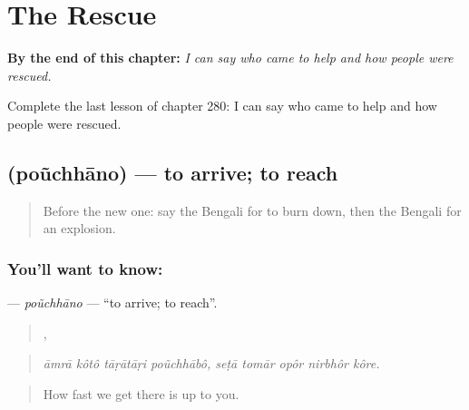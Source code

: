 
\chapter{The Rescue}
\label{ch:bn-the-rescue}

\begin{chapteropening}
\textbf{By the end of this chapter:} \emph{I can say who came to help and how people were rescued.}

Complete the last lesson of chapter 280: I can say who came to help and how people were rescued.
\end{chapteropening}

\section[\texorpdfstring{\bn{পৌঁছানো} (poũchhāno)}{পৌঁছানো (poũchhāno)}]{ (poũchhāno) — to arrive; to reach}

\label{lesson:BN-C280-pouchhano}



\begin{quote}
Before the new one: say the Bengali for to burn down, then the Bengali for an explosion.
\end{quote}

\subsection*{You'll want to know: }
\textbf{} — \emph{poũchhāno} — \textquotedblleft{}to arrive; to reach\textquotedblright{}.

\begin{quote}
   ,     
\end{quote}

\begin{quote}
\emph{āmrā kôtô tāṛātāṛi poũchhābô, seṭā tomār opôr nirbhôr kôre.}
\end{quote}

\begin{quote}
How fast we get there is up to you.
\end{quote}

